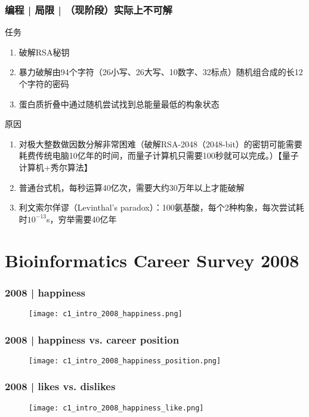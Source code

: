 \begin{frame}
  \frametitle{编程 | 局限 | （现阶段）实际上不可解}
  \begin{block}{任务}
    \begin{enumerate}
      \item<1-> 破解RSA秘钥
      \item<2-> 暴力破解由94个字符（26小写、26大写、10数字、32标点）随机组合成的长12个字符的密码
      \item<3-> 蛋白质折叠中通过随机尝试找到总能量最低的构象状态
    \end{enumerate}
  \end{block}
  \begin{block}{原因}
    \begin{enumerate}
      \item<1-> 对极大整数做因数分解非常困难（破解RSA-2048（2048-bit）的密钥可能需要耗费传统电脑10亿年的时间，而量子计算机只需要100秒就可以完成。）【量子计算机+秀尔算法】
      \item<2-> 普通台式机，每秒运算40亿次，需要大约30万年以上才能破解
      \item<3-> 利文索尔佯谬（Levinthal's paradox）：100氨基酸，每个2种构象，每次尝试耗时$10^{-13}$s，穷举需要40亿年
    \end{enumerate}
  \end{block}
\end{frame}

\section{Bioinformatics Career Survey 2008}
\begin{frame}
  \frametitle{2008 | happiness}
   \begin{figure}
     \centering
     \texttt{[image: c1\_intro\_2008\_happiness.png]}
   \end{figure}
\end{frame}

\begin{frame}
  \frametitle{2008 | happiness vs. career position}
   \begin{figure}
     \centering
     \texttt{[image: c1\_intro\_2008\_happiness\_position.png]}
   \end{figure}
\end{frame}

\begin{frame}
  \frametitle{2008 | likes vs. dislikes}
   \begin{figure}
     \centering
     \texttt{[image: c1\_intro\_2008\_happiness\_like.png]}
   \end{figure}
\end{frame}


